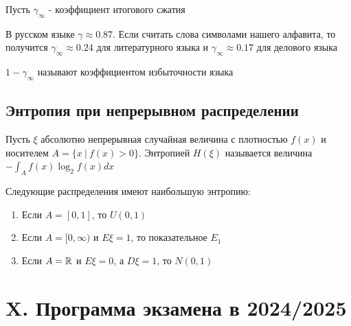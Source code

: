 \documentclass[12pt]{article}
\begin{document}
Пусть $\gamma_\infty$ - коэффициент итогового сжатия


В русском языке $\gamma \approx 0.87$. Если считать слова символами нашего алфавита, 
то получится $\gamma_\infty \approx 0.24$ для литературного языка и
$\gamma_\infty \approx 0.17$ для делового языка

\Def $1 - \gamma_\infty$ называют коэффициентом избыточности языка

\subsection{Энтропия при непрерывном распределении}

\Def Пусть $\xi$ абсолютно непрерывная случайная величина с плотностью $f(x)$ и носителем $A = \{x \ | \ f(x) > 0\}$. Энтропией $H(\xi)$ называется
величина $-\int_A f(x) \log_2 f(x) dx$

\begin{MyTheorem}
    \Ths Следующие распределения имеют наибольшую энтропию:

    \begin{enumerate}
        \item Если $A = [0, 1]$, то $U(0, 1)$

        \item Если $A = [0, \infty)$ и $E\xi = 1$, то показательное $E_1$

        \item Если $A = \mathbb{R}$ и $E\xi = 0$, а $D\xi = 1$, то $N(0, 1)$
    \end{enumerate}
\end{MyTheorem}



\clearpage

\section{X. Программа экзамена в 2024/2025}
\end{document}
